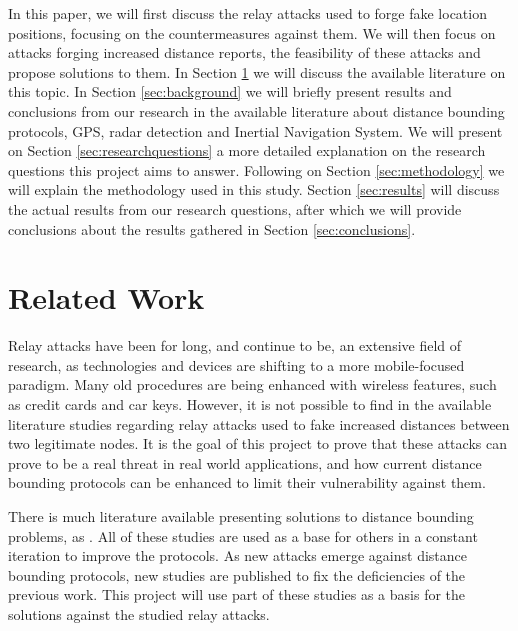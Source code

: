 \documentclass{article}
\begin{document}
In this paper, we will first discuss the relay attacks used to forge fake location positions, focusing on the countermeasures against them. We will then focus on attacks forging increased distance reports, the feasibility of these attacks and propose solutions to them. In Section \ref{sec:relatedwork} we will discuss the available literature on this topic. In Section \ref{sec:background} we will briefly present results and conclusions from our research in the available literature about distance bounding protocols, GPS, radar detection and Inertial Navigation System. We will present on Section \ref{sec:researchquestions} a more detailed explanation on the research questions this project aims to answer. Following on Section \ref{sec:methodology} we will explain the methodology used in this study. Section \ref{sec:results} will discuss the actual results from our research questions, after which we will provide conclusions about the results gathered in Section \ref{sec:conclusions}.







\section{Related Work}
\label{sec:relatedwork}

Relay attacks have been for long, and continue to be, an extensive field of research, as technologies and devices are shifting to a more mobile-focused paradigm. Many old procedures are being enhanced with wireless features, such as credit cards and car keys. However, it is not possible to find in the available literature studies regarding relay attacks used to fake increased distances between two legitimate nodes. It is the goal of this project to prove that these attacks can prove to be a real threat in real world applications, and how current distance bounding protocols can be enhanced to limit their vulnerability against them.

There is much literature available presenting solutions to distance bounding problems, as \cite{brands1994distance, tu2007rfid, rasmussen2010realization}. All of these studies are used as a base for others in a constant iteration to improve the protocols. As new attacks emerge against distance bounding protocols, new studies are published to fix the deficiencies of the previous work. This project will use part of these studies as a basis for the solutions against the studied relay attacks.
\end{document}
